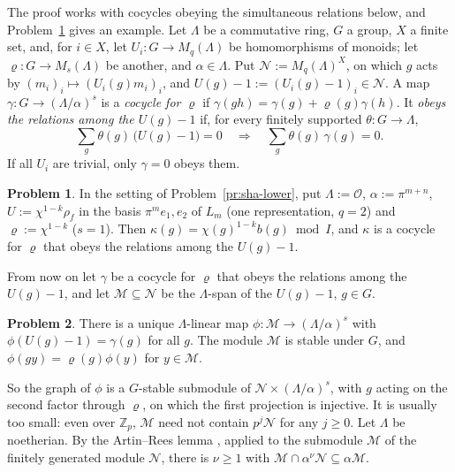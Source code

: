 \documentclass[reqno]{amsart}
\theoremstyle{definition}
\newtheorem{problem}{Problem}[section]
\theoremstyle{plain}
\newcommand{\Z}{\mathbb{Z}}
\newcommand{\Zp}{\Z_p}
\newcommand{\Oc}{\mathcal{O}}
\begin{document}
The proof works with cocycles obeying the simultaneous relations below, and Problem~\ref{pr:kappa-obeys} gives an example.  Let \(\Lambda\) be a commutative ring, \(G\) a group, \(X\) a finite set, and, for \(i \in X\), let \(U_i \colon G \to M_q(\Lambda)\) be homomorphisms of monoids; let \(\varrho \colon G \to M_s(\Lambda)\) be another, and \(\alpha \in \Lambda\).  Put \(\mathcal{N} := M_q(\Lambda)^X\), on which \(g\) acts by \((m_i)_i \mapsto (U_i(g)m_i)_i\), and \(U(g) - 1 := (U_i(g) - 1)_i \in \mathcal{N}\).  A map \(\gamma \colon G \to (\Lambda/\alpha)^s\) is a \emph{cocycle for \(\varrho\)} if \(\gamma(gh) = \gamma(g) + \varrho(g)\gamma(h)\).  It \emph{obeys the relations among the \(U(g) - 1\)} if, for every finitely supported \(\theta \colon G \to \Lambda\),
\[
  \sum_{g} \theta(g)\,\bigl(U(g) - 1\bigr) = 0 \quad\Longrightarrow\quad \sum_{g} \theta(g)\,\gamma(g) = 0 .
\]
If all \(U_i\) are trivial, only \(\gamma = 0\) obeys them.

\begin{problem}\label{pr:kappa-obeys}
In the setting of Problem~\ref{pr:sha-lower}, put \(\Lambda := \Oc\), \(\alpha := \pi^{m+n}\), \(U := \chi^{1-k}\rho_f\) in the basis \(\pi^m e_1, e_2\) of \(L_m\) (one representation, \(q = 2\)) and \(\varrho := \chi^{1-k}\) (\(s = 1\)).  Then \(\kappa(g) = \chi(g)^{1-k} b(g) \bmod I\), and \(\kappa\) is a cocycle for \(\varrho\) that obeys the relations among the \(U(g) - 1\).
\end{problem}

From now on let \(\gamma\) be a cocycle for \(\varrho\) that obeys the relations among the \(U(g) - 1\), and let \(\mathcal{M} \subseteq \mathcal{N}\) be the \(\Lambda\)-span of the \(U(g) - 1\), \(g \in G\).

\begin{problem}\label{pr:graph-map}
There is a unique \(\Lambda\)-linear map \(\phi \colon \mathcal{M} \to (\Lambda/\alpha)^s\) with \(\phi(U(g) - 1) = \gamma(g)\) for all \(g\).  The module \(\mathcal{M}\) is stable under \(G\), and \(\phi(g y) = \varrho(g)\phi(y)\) for \(y \in \mathcal{M}\).
\end{problem}

So the graph of \(\phi\) is a \(G\)-stable submodule of \(\mathcal{N} \times (\Lambda/\alpha)^s\), with \(g\) acting on the second factor through \(\varrho\), on which the first projection is injective.  It is usually too small: even over \(\Zp\), \(\mathcal{M}\) need not contain \(p^j\mathcal{N}\) for any \(j \ge 0\).  Let \(\Lambda\) be noetherian.  By the Artin--Rees lemma \cite[Cor.~10.10]{AM}, applied to the submodule \(\mathcal{M}\) of the finitely generated module \(\mathcal{N}\), there is \(\nu \ge 1\) with \(\mathcal{M} \cap \alpha^\nu \mathcal{N} \subseteq \alpha\mathcal{M}\).
\end{document}
